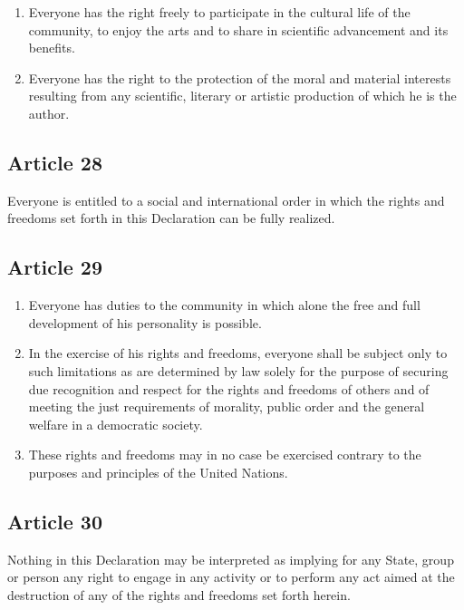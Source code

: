 \documentclass[
  titlepage,
  openright,
  DIV=calc,
  toc=listof,
  listof=nochaptergap]{scrbook}
\begin{document}
\begin{enumerate}
\def\labelenumi{\arabic{enumi}.}
\item
  Everyone has the right freely to participate in the cultural life of
  the community, to enjoy the arts and to share in scientific
  advancement and its benefits.
\item
  Everyone has the right to the protection of the moral and material
  interests resulting from any scientific, literary or artistic
  production of which he is the author.
\end{enumerate}

\subsection{Article 28}\label{article-28-1}

Everyone is entitled to a social and international order in which the
rights and freedoms set forth in this Declaration can be fully realized.

\subsection{Article 29}\label{article-29-1}

\begin{enumerate}
\def\labelenumi{\arabic{enumi}.}
\item
  Everyone has duties to the community in which alone the free and full
  development of his personality is possible.
\item
  In the exercise of his rights and freedoms, everyone shall be subject
  only to such limitations as are determined by law solely for the
  purpose of securing due recognition and respect for the rights and
  freedoms of others and of meeting the just requirements of morality,
  public order and the general welfare in a democratic society.
\item
  These rights and freedoms may in no case be exercised contrary to the
  purposes and principles of the United Nations.
\end{enumerate}

\subsection{Article 30}\label{article-30-1}

Nothing in this Declaration may be interpreted as implying for any
State, group or person any right to engage in any activity or to perform
any act aimed at the destruction of any of the rights and freedoms set
forth herein.
\end{document}
